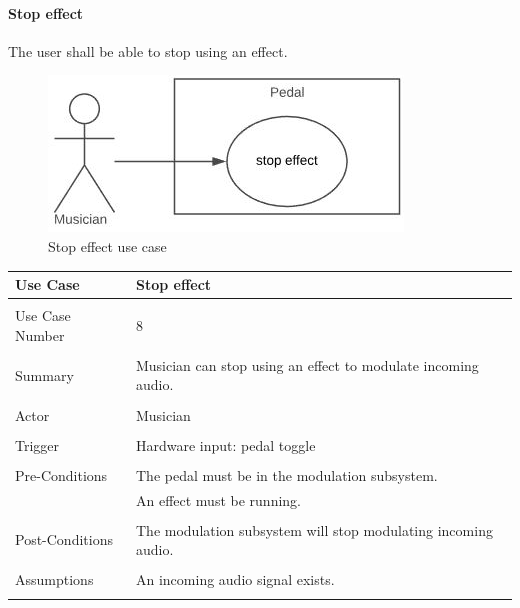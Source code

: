             \paragraph{Stop effect} 
            The user shall be able to stop using an effect.
            \begin{figure}[!ht]
                \centering
                \includegraphics[width=.5\textwidth]{diagrams/use_cases/uc-effect-stop.JPG}
                \caption{Stop effect use case}
                \label{fig:uc-stop-effect}
            \end{figure}
            \begin{table}[!ht]
                \centering
                \begin{tabular}{l l}
                    Use Case & Stop effect \\
                    \hline \\
                    Use Case Number & 8 \\ \\
                    Summary & Musician can stop using an effect to modulate incoming audio. \\ \\
                    Actor & Musician \\ \\
                    Trigger & Hardware input: pedal toggle \\ \\
                    Pre-Conditions & The pedal must be in the modulation subsystem. \\
                    & An effect must be running. \\ \\
                    Post-Conditions & The modulation subsystem will stop modulating incoming audio. \\ \\
                    Assumptions & An incoming audio signal exists.\\ \\
                \end{tabular}
            \end{table}     